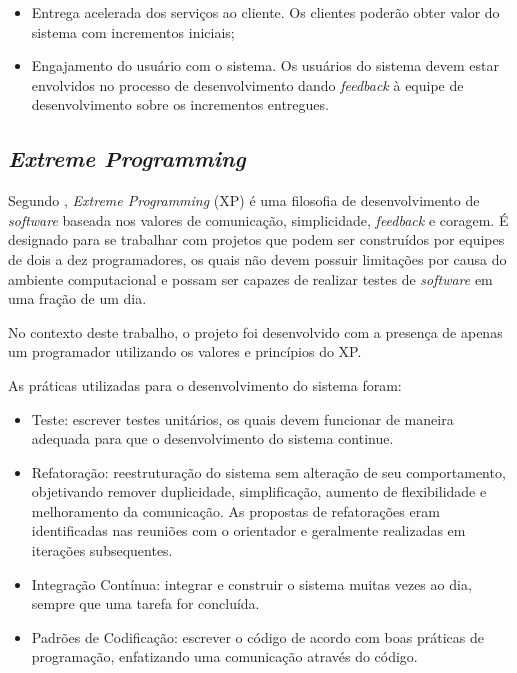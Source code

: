 \begin{itemize}
    \item Entrega acelerada dos serviços ao cliente. Os clientes poderão obter valor do sistema com incrementos iniciais;
    \item Engajamento do usuário com o sistema. Os usuários do sistema devem estar envolvidos no processo
    de desenvolvimento dando \textit{feedback} à equipe de desenvolvimento sobre os incrementos entregues.
\end{itemize}

    \subsection{\textit{Extreme Programming}}
    Segundo \cite{beck_2004}, \textit{Extreme Programming} (XP) é uma filosofia de desenvolvimento de \textit{software} baseada nos valores de comunicação, simplicidade, \textit{feedback} e coragem. É designado para se trabalhar com projetos que podem ser
    construídos por equipes de dois a dez programadores, os quais não devem possuir limitações
    por causa do ambiente computacional e possam ser capazes de realizar testes de
    \textit{software} em uma fração de um dia.

    No contexto deste trabalho, o projeto foi desenvolvido com a presença de apenas um
    programador utilizando os valores e princípios do XP.

    As práticas utilizadas para o desenvolvimento do sistema foram:

    \begin{itemize}
        \item Teste: escrever testes unitários, os quais devem funcionar de maneira adequada para que
        o desenvolvimento do sistema continue.
        \item Refatoração: reestruturação do sistema sem alteração de seu comportamento, objetivando
        remover duplicidade, simplificação, aumento de flexibilidade e melhoramento da comunicação. As propostas de refatorações eram identificadas nas reuniões com o orientador
        e geralmente realizadas em iterações subsequentes.
        \item Integração Contínua: integrar e construir o sistema muitas vezes ao dia, sempre que uma tarefa
        for concluída.
        \item Padrões de Codificação: escrever o código de acordo com boas práticas de programação, enfatizando uma comunicação através do código.
    \end{itemize}

